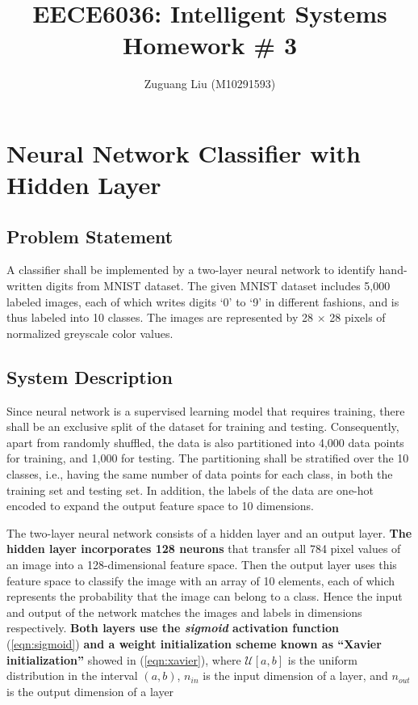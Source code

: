 \documentclass[11pt,titlepage]{article}
\title{EECE6036: Intelligent Systems\\Homework \# 3}
\author{Zuguang Liu (M10291593)}
\begin{document}
\maketitle

\section{Neural Network Classifier with Hidden Layer}
\subsection{Problem Statement}

A classifier shall be implemented by a two-layer neural network to identify hand-written digits from MNIST dataset. The given MNIST dataset includes 5,000 labeled images, each of which writes digits `0' to `9' in different fashions, and is thus labeled into 10 classes. The images are represented by 28 $\times$ 28 pixels of normalized greyscale color values. 

\subsection{System Description}
Since neural network is a supervised learning model that requires training, there shall be an exclusive split of the dataset for training and testing. Consequently, apart from randomly shuffled, the data is also partitioned into 4,000 data points for training, and 1,000 for testing. The partitioning shall be stratified over the 10 classes, i.e., having the same number of data points for each class, in both the training set and testing set. In addition, the labels of the data are one-hot encoded to expand the output feature space to 10 dimensions. 

The two-layer neural network consists of a hidden layer and an output layer. \textbf{The hidden layer incorporates 128 neurons} that transfer all 784 pixel values of an image into a 128-dimensional feature space. Then the output layer uses this feature space to classify the image with an array of 10 elements, each of which represents the probability that the image can belong to a class. Hence the input and output of the network matches the images and labels in dimensions respectively. \textbf{Both layers use the \textit{sigmoid} activation function} (\ref{eqn:sigmoid}) \textbf{and a weight initialization scheme known as ``Xavier initialization''} showed in (\ref{eqn:xavier}), where $\mathcal{U}[a,b]$ is the uniform distribution in the interval $(a,b)$, $n_{in}$ is the input dimension of a layer, and $n_{out}$ is the output dimension of a layer \cite{glorot_understanding_nodate}
\end{document}
